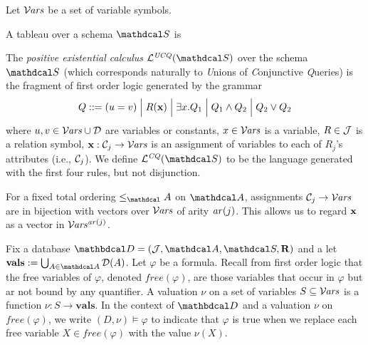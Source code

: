 \documentclass[the-pdg-manual.tex]{subfiles}
\begin{document}
\begin{fact}
\end{fact}


Let $\mathcal V\kern-.65pt\mathit{ars}$ be a set of variable symbols.

\begin{defn}
    A tableau over a schema $\Sch$ is 
\end{defn}

\begin{defn}[CQ,UCQ]
	The \emph{positive existential calculus} $\lang{UCQ}(\Sch)$ over the schema $\Sch$ (which corresponds naturally to \emph Unions of \emph Conjunctive \emph Queries) is the fragment of first order logic generated by the grammar
	\begin{align*}
		 Q ::= (u=v) \mathrel{\Big|} R(\mathbf x)  \mathrel{\Big|} \exists x. Q_1 \mathrel{\Big|} Q_1 \land Q_2 \mathrel{\Big|} Q_2 \lor Q_2  
	\end{align*}
	where $u,v \in \mathcal V\kern-.65pt\mathit{ars} \cup {\mathcal D}$ are variables
	or constants, $x \in \mathcal V\kern-.65pt\mathit{ars}$ is a variable,
	$R \in \mathcal J$ is a relation symbol, $\mathbf x  : \mathcal C_j \to {\mathcal V\kern-.65pt\mathit{ars}}$ is an assignment of variables to each of $R_j$'s attributes (i.e., $\mathcal C_j$). We define $\lang{CQ}(\Sch)$ to be the language generated with the first four rules, but not disjunction.
\end{defn}
	

\begin{inactive}
	For a fixed total ordering $\leq_\Attrs$ on $\Attrs$, assignments $\mathcal C_j \to \mathcal V\kern-.65pt\mathit{ars}$ are in bijection with vectors over $\mathcal V\kern-.65pt\mathit{ars}$ of arity $\mathit{ar}(j)$. This allows us to regard $\mathbf x$ as a vector in $\mathcal V\kern-.65pt\mathit{ars}^{\mathit{ar}(j)}$. 
\end{inactive}
Fix a database $\D = (\Idx,\Attrs,\Sch,\Rels)$ and a let $\vals := \bigcup_{A \in \Attrs}\Doms(A)$. Let $\varphi$ be a formula. 
Recall from first order logic that the free variables of $\varphi$, denoted $\mathit{free}(\varphi)$, are those variables that occur in $\varphi$ but ar not bound by any quantifier.
A valuation $\nu$ on a set of variables $S \subseteq \mathcal V\kern-.65pt\mathit{ars}$ is a function $\nu: S \to \mathbf{vals}$. 
In the context of $\D$ and a valuation $\nu$ on $\mathit{free}(\varphi)$, we write $(D,\nu) \models \varphi$ to indicate that $\varphi$ is true when we replace each free variable $X \in \mathit{free}(\varphi)$ with the value $\nu(X)$. %
\end{document}
